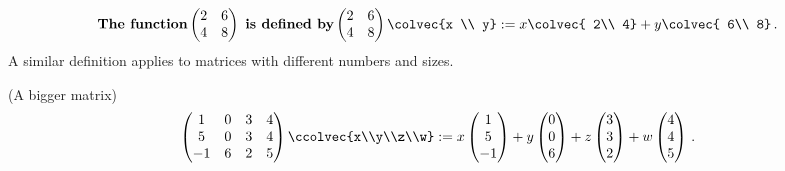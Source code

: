 \begin{equation*}
 \textbf{The~function}   \begin{pmatrix}
      2     & 6 \\
      4     & 8
    \end{pmatrix}~\textbf{is~defined~by}
    \begin{pmatrix}
      2     & 6 \\
      4     & 8
    \end{pmatrix}
  \colvec{x \\ y}
  := x \colvec{ 2\\ 4} + y \colvec{ 6\\ 8} \, .
\end{equation*}
A similar definition applies to matrices with different numbers and sizes.

\begin{example}(A bigger matrix)
\[
\begin{pmatrix}1&0&3&4\\
5&0&3&4\\
-1&6&2&5
\end{pmatrix}
\ccolvec{x\\y\\z\\w}
:=x
\begin{pmatrix}1\\5\\-1
\end{pmatrix}
+y
\begin{pmatrix}0\\0\\6
\end{pmatrix}
+z
\begin{pmatrix}3\\3\\2
\end{pmatrix}
+w\begin{pmatrix}4\\4\\5
\end{pmatrix}\, .
\]
\end{example}


